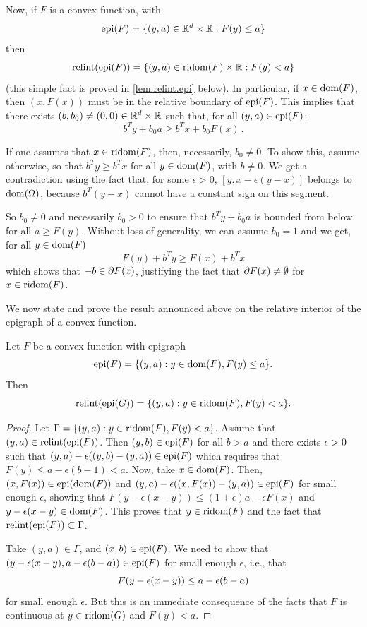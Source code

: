  Now, if $F$ is a convex function, with
 \[
 \mathrm{epi}(F) = \{(y,a)\in {\mathbb{R}}^d\times {\mathbb{R}}: F(y) \leq a\}
 \]
 then 
 \[
 \mathrm{relint}(\mathrm{epi}(F)) = \{(y,a)\in \mathrm{ridom}(F) \times {\mathbb{R}}: F(y) < a\}
 \]
 (this simple fact is proved in \cref{lem:relint.epi} below). In particular, if $x\in \mathrm{dom}(F)$, then $(x, F(x))$ must be in the relative boundary of $\mathrm{epi}(F)$. This implies that there exists $(b, b_0)\neq(0,0) \in {\mathbb{R}}^d \times {\mathbb{R}}$ such that, for all $(y, a) \in \mathrm{epi}(F)$:
 \[
 b^T y + b_0 a \geq b^T x + b_0 F(x)\,.
 \] 

If one assumes that $x\in \mathrm{ridom}(F)$, then, necessarily, $b_0\neq 0$. To show this, assume otherwise, so that $b^T y \geq b^T x$ for all $y\in \mathrm{dom}(F)$, with $b\neq 0$. We get a contradiction using the fact that, for some $\epsilon>0$, $[y, x - \epsilon(y-x)]$ belongs to $\mathrm{dom}(\Omega)$, because $b^T(y-x)$ cannot have a constant sign on this segment.

So $b_0\neq 0$ and necessarily $b_0>0$ to ensure that $b^Ty + b_0 a$ is bounded from below for all $a\geq F(y)$. Without loss of generality, we can assume $b_0=1$ and we get, for all $y\in \mathrm{dom}(F)$
\[
F(y) + b^T y \geq F(x) + b^T x
\]
which shows that $-b \in \partial F(x)$, justifying the fact that $\partial F(x)\neq \emptyset$ for $x\in \mathrm{ridom}(F)$.

We now state and prove the result announced above on the relative interior of the epigraph of a convex function.
 \begin{lemma}
 \label{lem:relint.epi}
Let $F$ be a convex function with epigraph
\[
\mathrm{epi}(F) = \{(y,a): y\in \mathrm{dom}(F), F(y) \leq a\}.
\]
Then
\[
\mathrm{relint}(\mathrm{epi}(G)) = \{(y,a): y\in \mathrm{ridom}(F), F(y) < a\}.
\]
\end{lemma}
\begin{proof}
Let $\Gamma = \{(y,a): y\in \mathrm{ridom}(F), F(y) < a\}$. Assume that $(y,a) \in \mathrm{relint}(\mathrm{epi}(F))$. Then $(y,b) \in \mathrm{epi}(F)$ for all $b>a$ and there exists $\epsilon>0$ such that $(y,a) - \epsilon ((y,b) - (y,a)) \in \mathrm{epi}(F)$ which  requires that $F(y) \leq a - \epsilon(b-1) < a$. Now, take $x\in \mathrm{dom}(F)$. Then, $(x,F(x))\in \mathrm{epi}(\mathrm{dom}(F))$ and $(y, a) - \epsilon ((x, F(x)) - (y,a)) \in \mathrm{epi}(F)$ for small enough $\epsilon$, showing that $F(y - \epsilon(x-y)) \leq (1+\epsilon) a -\epsilon F(x)$ and $y - \epsilon(x-y) \in\mathrm{dom}(F)$. This proves that $y\in \mathrm{ridom}(F)$ and the fact that $\mathrm{relint}(\mathrm{epi}(F)) \subset \Gamma$.    

Take $(y,a) \in \Gamma$, and $(x,b) \in \mathrm{epi}(F)$. We need to show that $(y - \epsilon(x-y), a - \epsilon(b-a))\in \mathrm{epi}(F)$ for small enough $\epsilon$, i.e., that
\[
F(y - \epsilon(x-y)) \leq a - \epsilon(b-a)
\]
for small enough $\epsilon$. But this is an immediate consequence of the facts that $F$ is continuous at $y\in\mathrm{ridom}(G)$ and $F(y) < a$.
\end{proof}

